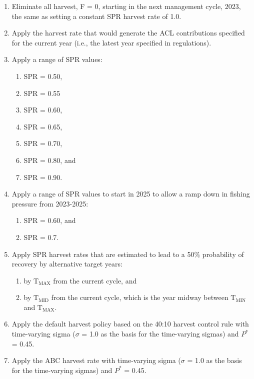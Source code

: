 \documentclass[11pt,
  english,
  letterpaper,
]{article}
\begin{document}
\leavevmode\tagmcend\tagstructend\par

\begin{enumerate}
    \item Eliminate all harvest, F = 0, starting in the next management cycle, 2023, the same as setting a constant SPR harvest rate of 1.0.
    \item Apply the harvest rate that would generate the ACL contributions specified for the current year (i.e., the latest year specified in regulations). 
    \item Apply a range of SPR values: 
    \begin{enumerate}
     \item SPR = 0.50,
     \item SPR = 0.55
     \item SPR = 0.60,
     \item SPR = 0.65,
     \item SPR = 0.70,
     \item SPR = 0.80, and
     \item SPR = 0.90. 
    \end{enumerate}
    \item Apply a range of SPR values to start in 2025 to allow a ramp down in fishing pressure from 2023-2025:
    \begin{enumerate}
     \item SPR = 0.60, and
     \item SPR = 0.7.
    \end{enumerate}
    \item Apply SPR harvest rates that are estimated to lead to a 50$\%$ probability of recovery by alternative target years: 
    \begin{enumerate}
     \item by $\text{T}_\text{MAX}$ from the current cycle, and 
     \item by $\text{T}_\text{MID}$ from the current cycle, which is the year midway between $\text{T}_\text{MIN}$ and $\text{T}_\text{MAX}$.
    \end{enumerate}
    \item Apply the default harvest policy based on the 40:10 harvest control rule with time-varying sigma ($\sigma$ = 1.0 as the basis for the time-varying sigmas) and $P^*$ = 0.45.
    \item Apply the ABC harvest rate with time-varying sigma ($\sigma$ = 1.0 as the basis for the time-varying sigmas) and $P^*$ = 0.45.
\end{enumerate}
\end{document}
